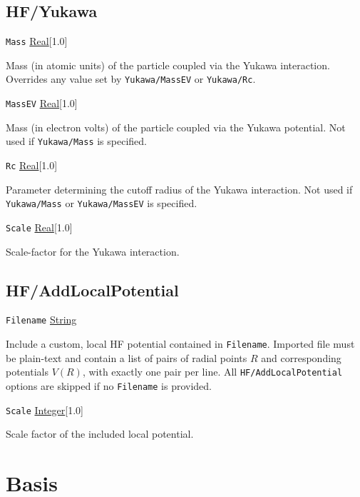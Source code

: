 \documentclass{report}
\begin{document}
\subsection{HF/Yukawa}
\texttt{Mass} \uline{Real}[1.0]
\begin{adjustwidth}{1cm}{}
Mass (in atomic units) of the particle coupled via the Yukawa interaction. Overrides any value set by
\texttt{Yukawa/MassEV} or \texttt{Yukawa/Rc}.
\end{adjustwidth}

\texttt{MassEV} \uline{Real}[1.0]
\begin{adjustwidth}{1cm}{}
Mass (in electron volts) of the particle coupled via the Yukawa potential. Not used if
\texttt{Yukawa/Mass} is specified.
\end{adjustwidth}

\texttt{Rc} \uline{Real}[1.0]
\begin{adjustwidth}{1cm}{}
Parameter determining the cutoff radius of the Yukawa interaction. Not used if \texttt{Yukawa/Mass}
or \texttt{Yukawa/MassEV} is specified.
\end{adjustwidth}

\texttt{Scale} \uline{Real}[1.0]
\begin{adjustwidth}{1cm}{}
Scale-factor for the Yukawa interaction.
\end{adjustwidth}

\subsection{HF/AddLocalPotential}

\texttt{Filename} \uline{String}
\begin{adjustwidth}{1cm}{}
Include a custom, local HF potential contained in \texttt{Filename}. Imported file must be plain-text
and contain a list of pairs of radial points $R$ and corresponding potentials $V(R)$, with exactly one
pair per line. All \texttt{HF/AddLocalPotential} options are skipped if no \texttt{Filename} is provided.
\end{adjustwidth}

\texttt{Scale} \uline{Integer}[1.0]
\begin{adjustwidth}{1cm}{}
Scale factor of the included local potential.
\end{adjustwidth}

\section{Basis}
\end{document}
